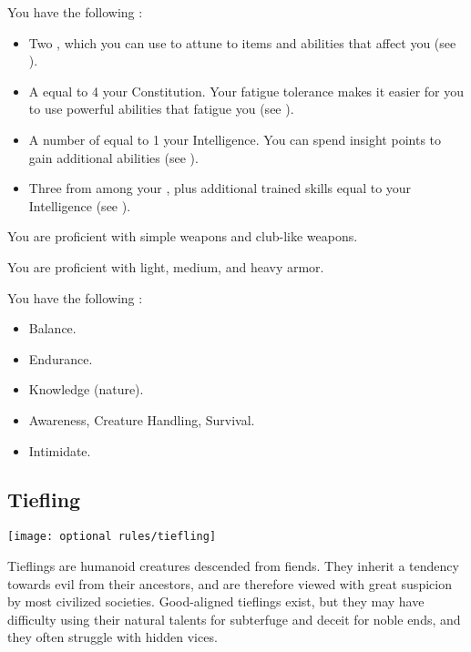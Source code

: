              You have the following :
            \begin{itemize}
                \item Two , which you can use to attune to items and abilities that affect you (see ).
                \item A  equal to 4 \add your Constitution.
                    Your fatigue tolerance makes it easier for you to use powerful abilities that fatigue you (see ).
                \item A number of  equal to 1 \add your Intelligence.
                    You can spend insight points to gain additional abilities (see ).
                \item Three  from among your , plus additional trained skills equal to your Intelligence (see ).
            \end{itemize}

            You are proficient with simple weapons and club-like weapons.

            You are proficient with light, medium, and heavy armor.

            You have the following :
            \begin{itemize}
                \item {} Balance.
                \item {} Endurance.
                \item {} Knowledge (nature).
                \item {} Awareness, Creature Handling, Survival.
                \item {} Intimidate.
            \end{itemize}

    \subsection{Tiefling}
        \texttt{[image: optional rules/tiefling]}

        Tieflings are humanoid creatures descended from fiends.
        They inherit a tendency towards evil from their ancestors, and are therefore viewed with great suspicion by most civilized societies.
        Good-aligned tieflings exist, but they may have difficulty using their natural talents for subterfuge and deceit for noble ends, and they often struggle with hidden vices.

